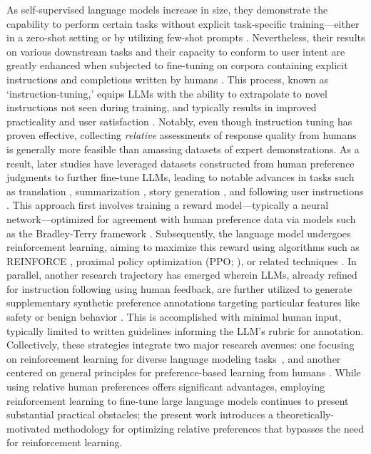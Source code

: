 As self-supervised language models increase in size, they demonstrate the capability to perform certain tasks without explicit task-specific training—either in a zero-shot setting \citep{radford2019language} or by utilizing few-shot prompts \citep{gpt3,megatron,chowdhery2022palm}. Nevertheless, their results on various downstream tasks and their capacity to conform to user intent are greatly enhanced when subjected to fine-tuning on corpora containing explicit instructions and completions written by humans \citep{mishra-etal-2022-cross,sanh2022multitask,chung2022scaling,thoppilan2022lamda}. This process, known as `instruction-tuning,’ equips LLMs with the ability to extrapolate to novel instructions not seen during training, and typically results in improved practicality and user satisfaction \citep{chung2022scaling}. Notably, even though instruction tuning has proven effective, collecting \textit{relative} assessments of response quality from humans is generally more feasible than amassing datasets of expert demonstrations. As a result, later studies have leveraged datasets constructed from human preference judgments to further fine-tune LLMs, leading to notable advances in tasks such as translation \citep{kreutzer-etal-2018-reliability}, summarization \citep{stiennon2022learning,ziegler2020finetuning}, story generation \citep{ziegler2020finetuning}, and following user instructions \citep{ouyang2022training,ramamurthy2023is}. This approach first involves training a reward model—typically a neural network—optimized for agreement with human preference data via models such as the Bradley-Terry framework \citep{bradley1952rankanalysis}. Subsequently, the language model undergoes reinforcement learning, aiming to maximize this reward using algorithms such as REINFORCE \citep{williams1992reinforce}, proximal policy optimization (PPO; \cite{schulman2017proximal}), or related techniques \citep{ramamurthy2023is}. In parallel, another research trajectory has emerged wherein LLMs, already refined for instruction following using human feedback, are further utilized to generate supplementary synthetic preference annotations targeting particular features like safety or benign behavior \citep{bai2022constitutional}. This is accomplished with minimal human input, typically limited to written guidelines informing the LLM’s rubric for annotation. Collectively, these strategies integrate two major research avenues: one focusing on reinforcement learning for diverse language modeling tasks~\citep{Ranzato2015SequenceLT,paulus2018a,wu2018learning}, and another centered on general principles for preference-based learning from humans \citep{christiano2017deep,kupcsik2018learning}. While using relative human preferences offers significant advantages, employing reinforcement learning to fine-tune large language models continues to present substantial practical obstacles; the present work introduces a theoretically-motivated methodology for optimizing relative preferences that bypasses the need for reinforcement learning.

